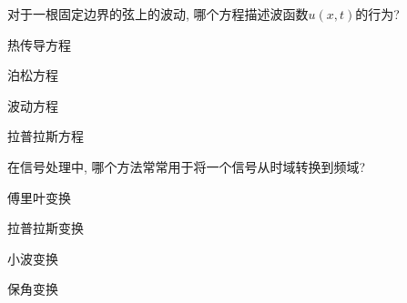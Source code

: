 \documentclass{njustexam}
\begin{document}




\begin{problem}
  对于一根固定边界的弦上的波动, 哪个方程描述波函数$u(x,  t)$的行为?
  \begin{abcd}
    \item 热传导方程 
    \item 泊松方程
    \item 波动方程
    \item 拉普拉斯方程
    \end{abcd}
\end{problem}

\begin{problem}
  在信号处理中, 哪个方法常常用于将一个信号从时域转换到频域?
  \begin{abcd}
    \item 傅里叶变换 
    \item 拉普拉斯变换
    \item 小波变换
    \item 保角变换
  \end{abcd}
\end{problem}



    
    
\end{document}
